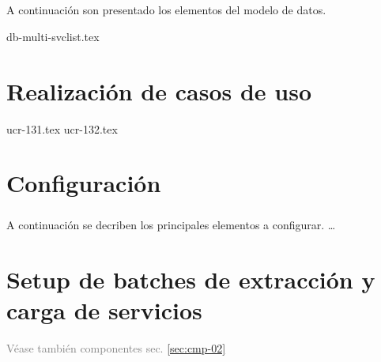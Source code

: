 \documentclass[11pt,letterpaper]{report}
\begin{document}
\paragraph{}
A continuaci\'on son presentado los elementos del modelo de datos.

{db-multi-svclist.tex}



\chapter{Realizaci\'on de casos de uso}\label{chap:ucr}

{ucr-131.tex}
{ucr-132.tex}


\appendix

\chapter{Configuraci\'on}
\paragraph{}
A continuaci\'on se decriben los principales elementos a configurar.
\ldots


\chapter[Batches setup]{Setup de batches de extracci\'on y carga de servicios}
\textcolor{gray}{V\'ease tambi\'en componentes sec. \ref{sec:cmp-02}}
\paragraph{}



\end{document}
